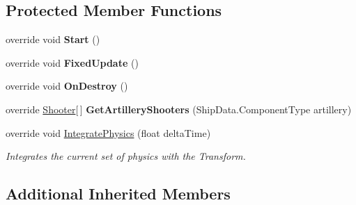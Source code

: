 \subsection*{Protected Member Functions}
\begin{DoxyCompactItemize}
\item 
\hypertarget{class_skyrates_1_1_client_1_1_entity_1_1_entity_ship_navy_ae26515dbbab5e7ccd94bc182077a3703}{override void {\bfseries Start} ()}\label{class_skyrates_1_1_client_1_1_entity_1_1_entity_ship_navy_ae26515dbbab5e7ccd94bc182077a3703}

\item 
\hypertarget{class_skyrates_1_1_client_1_1_entity_1_1_entity_ship_navy_aa550d27c1aaf35d1cf2d3c9ab6072d19}{override void {\bfseries Fixed\-Update} ()}\label{class_skyrates_1_1_client_1_1_entity_1_1_entity_ship_navy_aa550d27c1aaf35d1cf2d3c9ab6072d19}

\item 
\hypertarget{class_skyrates_1_1_client_1_1_entity_1_1_entity_ship_navy_af524017b295a99be4257b6cbd3ded232}{override void {\bfseries On\-Destroy} ()}\label{class_skyrates_1_1_client_1_1_entity_1_1_entity_ship_navy_af524017b295a99be4257b6cbd3ded232}

\item 
\hypertarget{class_skyrates_1_1_client_1_1_entity_1_1_entity_ship_navy_ab3c53268f487acadfa25c518ac90ec66}{override \hyperlink{class_shooter}{Shooter}\mbox{[}$\,$\mbox{]} {\bfseries Get\-Artillery\-Shooters} (Ship\-Data.\-Component\-Type artillery)}\label{class_skyrates_1_1_client_1_1_entity_1_1_entity_ship_navy_ab3c53268f487acadfa25c518ac90ec66}

\item 
override void \hyperlink{class_skyrates_1_1_client_1_1_entity_1_1_entity_ship_navy_a689b368554044f48d19b20aed42fe104}{Integrate\-Physics} (float delta\-Time)
\begin{DoxyCompactList}\small\item\em Integrates the current set of physics with the Transform. \end{DoxyCompactList}\end{DoxyCompactItemize}
\subsection*{Additional Inherited Members}


